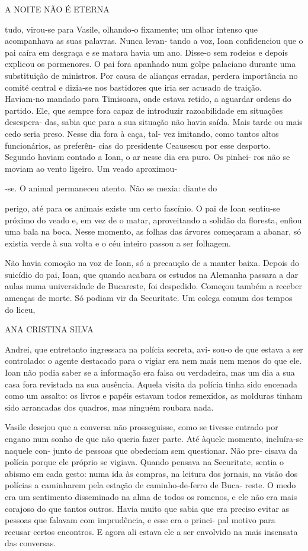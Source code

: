 A NOITE NÃO É ETERNA

tudo, virou‑se para Vasile, olhando‑o fixamente; um olhar intenso que
acompanhava as suas palavras. Nunca levan‑ tando a voz, Ioan
confidenciou que o pai caíra em desgraça e se matara havia um ano.
Disse‑o sem rodeios e depois explicou os pormenores. O pai fora apanhado
num golpe palaciano durante uma substituição de ministros. Por causa de
alianças erradas, perdera importância no comité central e dizia‑se nos
bastidores que iria ser acusado de traição. Haviam‑no mandado para
Timisoara, onde estava retido, a aguardar ordens do partido. Ele, que
sempre fora capaz de introduzir razoabilidade em situações desespera‑
das, sabia que para a sua situação não havia saída. Mais tarde ou mais
cedo seria preso. Nesse dia fora à caça, tal‑ vez imitando, como tantos
altos funcionários, as preferên‑ cias do presidente Ceausescu por esse
desporto. Segundo haviam contado a Ioan, o ar nesse dia era puro. Os
pinhei‑ ros não se moviam ao vento ligeiro. Um veado aproximou‑

‑se. O animal permaneceu atento. Não se mexia: diante do

perigo, até para os animais existe um certo fascínio. O pai de Ioan
sentiu‑se próximo do veado e, em vez de o matar, aproveitando a solidão
da floresta, enfiou uma bala na boca. Nesse momento, as folhas das
árvores começaram a abanar, só existia verde à sua volta e o céu inteiro
passou a ser folhagem.

Não havia comoção na voz de Ioan, só a precaução de a manter baixa.
Depois do suicídio do pai, Ioan, que quando acabara os estudos na
Alemanha passara a dar aulas numa universidade de Bucareste, foi
despedido. Começou também a receber ameaças de morte. Só podiam vir da
Securitate. Um colega comum dos tempos do liceu,

ANA CRISTINA SILVA

Andrei, que entretanto ingressara na polícia secreta, avi‑ sou‑o de que
estava a ser controlado: o agente destacado para o vigiar era nem mais
nem menos do que ele. Ioan não podia saber se a informação era falsa ou
verdadeira, mas um dia a sua casa fora revistada na sua ausência. Aquela
visita da polícia tinha sido encenada como um assalto: os livros e
papéis estavam todos remexidos, as molduras tinham sido arrancadas dos
quadros, mas ninguém roubara nada.

Vasile desejou que a conversa não prosseguisse, como se tivesse entrado
por engano num sonho de que não queria fazer parte. Até àquele momento,
incluíra‑se naquele con‑ junto de pessoas que obedeciam sem questionar.
Não pre‑ cisava da polícia porque ele próprio se vigiava. Quando pensava
na Securitate, sentia o abismo em cada gesto: numa ida às compras, na
leitura dos jornais, na visão dos polícias a caminharem pela estação de
caminho‑de‑ferro de Buca‑ reste. O medo era um sentimento disseminado na
alma de todos os romenos, e ele não era mais corajoso do que tantos
outros. Havia muito que sabia que era preciso evitar as pessoas que
falavam com imprudência, e esse era o princi‑ pal motivo para recusar
certos encontros. E agora ali estava ele a ser envolvido na mais
insensata das conversas.

